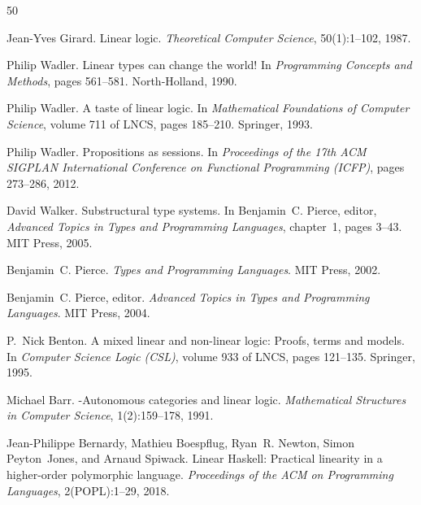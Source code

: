 \documentclass[11pt]{article}
\begin{document}
\begin{thebibliography}{50}

Jean-Yves Girard.
\newblock Linear logic.
\newblock \emph{Theoretical Computer Science}, 50(1):1--102, 1987.

Philip Wadler.
\newblock Linear types can change the world!
\newblock In \emph{Programming Concepts and Methods}, pages 561--581. North-Holland, 1990.

Philip Wadler.
\newblock A taste of linear logic.
\newblock In \emph{Mathematical Foundations of Computer Science}, volume 711 of LNCS, pages 185--210. Springer, 1993.

Philip Wadler.
\newblock Propositions as sessions.
\newblock In \emph{Proceedings of the 17th ACM SIGPLAN International Conference on Functional Programming (ICFP)}, pages 273--286, 2012.

David Walker.
\newblock Substructural type systems.
\newblock In Benjamin~C. Pierce, editor, \emph{Advanced Topics in Types and Programming Languages}, chapter~1, pages 3--43. MIT Press, 2005.

Benjamin~C. Pierce.
\newblock \emph{Types and Programming Languages}.
\newblock MIT Press, 2002.

Benjamin~C. Pierce, editor.
\newblock \emph{Advanced Topics in Types and Programming Languages}.
\newblock MIT Press, 2004.

P.~Nick Benton.
\newblock A mixed linear and non-linear logic: Proofs, terms and models.
\newblock In \emph{Computer Science Logic (CSL)}, volume 933 of LNCS, pages 121--135. Springer, 1995.

Michael Barr.
\newblock {$\ast$}-Autonomous categories and linear logic.
\newblock \emph{Mathematical Structures in Computer Science}, 1(2):159--178, 1991.

Jean-Philippe Bernardy, Mathieu Boespflug, Ryan~R. Newton, Simon Peyton~Jones, and Arnaud Spiwack.
\newblock Linear {H}askell: Practical linearity in a higher-order polymorphic language.
\newblock \emph{Proceedings of the ACM on Programming Languages}, 2(POPL):1--29, 2018.


\end{thebibliography}
\end{document}
